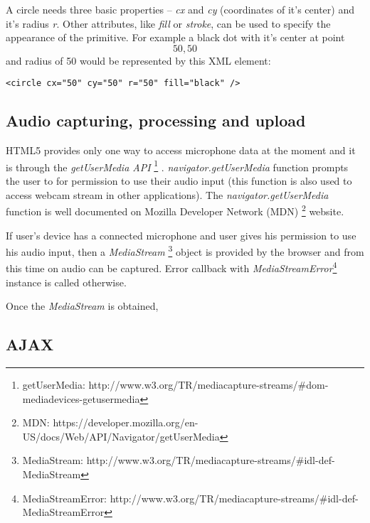 A circle needs three basic properties -- \textit{cx} and \textit{cy} (coordinates of it's center) and it's radius \textit{r}. Other attributes, like \textit{fill} or \textit{stroke}, can be used to specify the appearance of the primitive. For example a black dot with it's center at point \textit{\[50, 50\]} and radius of 50 would be represented by this XML element:

\begin{verbatim}
<circle cx="50" cy="50" r="50" fill="black" />
\end{verbatim}



\subsection{Audio capturing, processing and upload}

HTML5 provides only one way to access microphone data at the moment and it is through the \textit{getUserMedia API} \footnote{getUserMedia: http://www.w3.org/TR/mediacapture-streams/\#dom-mediadevices-getusermedia} \cite{}. \textit{navigator.getUserMedia} function prompts the user to for permission to use their audio input (this function is also used to access webcam stream in other applications). The \textit{navigator.getUserMedia} function is well documented on Mozilla Developer Network (MDN) \footnote{MDN: https://developer.mozilla.org/en-US/docs/Web/API/Navigator/getUserMedia} website.

If user's device has a connected microphone and user gives his permission to use his audio input, then a \textit{MediaStream} \footnote{MediaStream: http://www.w3.org/TR/mediacapture-streams/\#idl-def-MediaStream} object is provided by the browser and from this time on audio can be captured. Error callback with \textit{MediaStreamError}\footnote{MediaStreamError: http://www.w3.org/TR/mediacapture-streams/\#idl-def-MediaStreamError} instance is called otherwise.

Once the \textit{MediaStream} is obtained, 

\subsection{AJAX}



